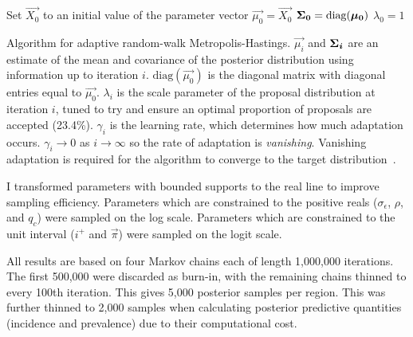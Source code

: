 \documentclass[thesis.tex]{subfiles}
\begin{document}
\begin{algorithm}
 Set $\vec{X_0}$ to an initial value of the parameter vector \;
 $\vec{\mu_0} = \vec{X_0}$ \;
 $\bm{\Sigma_0} = \text{diag}(\bm{\mu_0})$ \;
 $\lambda_0 = 1$ \;
 \caption{Algorithm for adaptive random-walk Metropolis-Hastings. $\vec{\mu_i}$ and $\bm{\Sigma_i}$ are an estimate of the mean and covariance of the posterior distribution using information up to iteration $i$. $\text{diag}(\vec{\mu_0})$ is the diagonal matrix with diagonal entries equal to $\vec{\mu_0}$. $\lambda_i$ is the scale parameter of the proposal distribution at iteration $i$, tuned to try and ensure an optimal proportion of proposals are accepted (23.4\%). $\gamma_i$ is the learning rate, which determines how much adaptation occurs. $\gamma_i \to 0$ as $i \to \infty$ so the rate of adaptation is \emph{vanishing}. Vanishing adaptation is required for the algorithm to converge to the target distribution~\autocite[section 3]{andrieuTutorial}.}
 \label{SEIR:MCMC-algorithm}
\end{algorithm}

I transformed parameters with bounded supports to the real line to improve sampling efficiency.
Parameters which are constrained to the positive reals ($\sigma_\epsilon$, $\rho$, and $q_c$) were sampled on the log scale.
Parameters which are constrained to the unit interval ($i^+$ and $\vec{\pi}$) were sampled on the logit scale.

All results are based on four Markov chains each of length 1,000,000 iterations.
The first 500,000 were discarded as burn-in, with the remaining chains thinned to every 100th iteration.
This gives 5,000 posterior samples per region.
This was further thinned to 2,000 samples when calculating posterior predictive quantities (incidence and prevalence) due to their computational cost.
\end{document}
